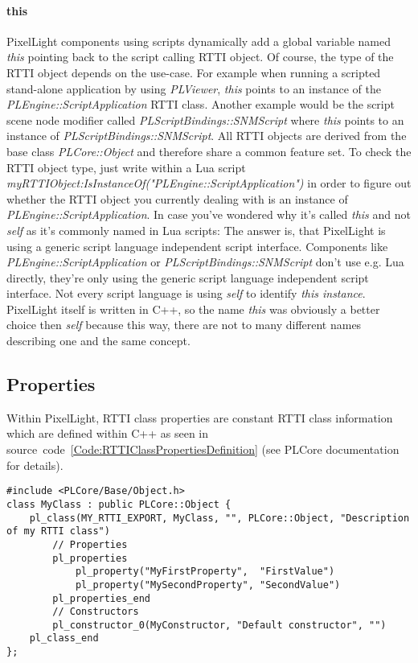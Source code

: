 \paragraph{this}
PixelLight components using scripts dynamically add a global variable named \emph{this} pointing back to the script calling RTTI object. Of course, the type of the RTTI object depends on the use-case. For example when running a scripted stand-alone application by using \emph{PLViewer}, \emph{this} points to an instance of the \emph{PLEngine::ScriptApplication} RTTI class. Another example would be the script scene node modifier called \emph{PLScriptBindings::SNMScript} where \emph{this} points to an instance of \emph{PLScriptBindings::SNMScript}. All RTTI objects are derived from the base class \emph{PLCore::Object} and therefore share a common feature set. To check the RTTI object type, just write within a Lua script \emph{myRTTIObject:IsInstanceOf("PLEngine::ScriptApplication")} in order to figure out whether the RTTI object you currently dealing with is an instance of \emph{PLEngine::ScriptApplication}. In case you've wondered why it's called \emph{this} and not \emph{self} as it's commonly named in Lua scripts: The answer is, that PixelLight is using a generic script language independent script interface. Components like \emph{PLEngine::ScriptApplication} or \emph{PLScriptBindings::SNMScript} don't use e.g. Lua directly, they're only using the generic script language independent script interface. Not every script language is using \emph{self} to identify \emph{this instance}. PixelLight itself is written in C++, so the name \emph{this} was obviously a better choice then \emph{self} because this way, there are not to many different names describing one and the same concept.


\subsection{Properties}
Within PixelLight, RTTI class properties are constant RTTI class information which are defined within C++ as seen in source~code~\ref{Code:RTTIClassPropertiesDefinition} (see PLCore documentation for details).
\begin{lstlisting}[label=Code:RTTIClassPropertiesDefinition,caption={Defining a new RTTI class with properties (C++)}]
#include <PLCore/Base/Object.h>
class MyClass : public PLCore::Object {
	pl_class(MY_RTTI_EXPORT, MyClass, "", PLCore::Object, "Description of my RTTI class")
		// Properties
		pl_properties
			pl_property("MyFirstProperty",  "FirstValue")
			pl_property("MySecondProperty", "SecondValue")
		pl_properties_end
		// Constructors
		pl_constructor_0(MyConstructor, "Default constructor", "")
	pl_class_end
};
\end{lstlisting}

